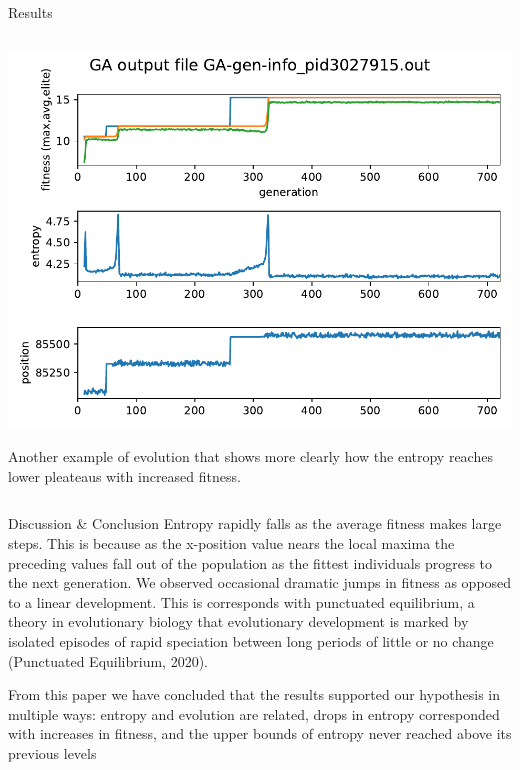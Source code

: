 \documentclass[handout,10pt,aspectratio=169]{beamer}
\begin{document}
\begin{frame}{Results}
\begin{columns}
    \begin{column}{0.6\textwidth}
     \includegraphics[width=\textwidth]{GA-gen-info_pid3027915.out.pdf}\\ {\tiny
      				\begin{singlespace}
      				Another example of evolution that shows more clearly how
      				the entropy reaches lower pleateaus with increased fitness.
      				\end{singlespace}	
      		}
    \end{column}
  \end{columns}
\end{frame}

\begin{frame}{Discussion \& Conclusion}
	Entropy rapidly falls as the average fitness makes large steps. This
	is because as the x-position value nears the local maxima the
	preceding values fall out of the population as the fittest individuals
	progress to the next generation. We observed occasional dramatic jumps
	in fitness as opposed to a linear development. This is corresponds
	with punctuated equilibrium, a theory in evolutionary biology that
	evolutionary development is marked by isolated episodes of rapid
	speciation between long periods of little or no change (Punctuated
	Equilibrium, 2020).
	
	
	
	\medskip
	From this paper we have concluded that the results supported our hypothesis in multiple ways: entropy and evolution are related, drops in entropy corresponded with increases in fitness, and the upper bounds of entropy never reached above its previous levels
		
\end{frame}
\end{document}
